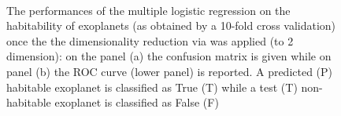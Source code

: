 \documentclass[
12pt, %
a4paper, %
oneside, %
headinclude,footinclude, %
BCOR5mm, %
]{scrartcl}
\begin{document}
\begin{figure}[h]
  \centering
{}\\
\caption{The performances of the multiple logistic regression on the habitability of exoplanets (as obtained by a 10-fold cross validation) once the the dimensionality reduction via was applied (to 2 dimension): on the panel (a) the confusion matrix is given  while on panel (b) the ROC curve (lower panel) is reported.  A predicted (P) habitable exoplanet is classified as True (T) while a test (T) non-habitable exoplanet is classified as False (F)}
\label{logistic_performances}
\end{figure}

\clearpage
\end{document}
